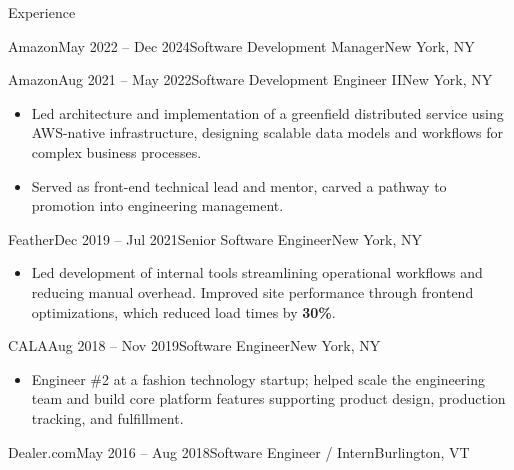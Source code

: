 \documentclass{resume} %
\begin{document}
\begin{rSection}{Experience}
\begin{rSubsection}{Amazon}{May 2022 -- Dec 2024}{Software Development Manager}{New York, NY}
\end{rSubsection}
\begin{rSubsection}{Amazon}{Aug 2021 -- May 2022}{Software Development Engineer II}{New York, NY}

\begin{itemize}
  \item Led architecture and implementation of a greenfield distributed service using AWS-native infrastructure, designing scalable data models and workflows for complex business processes.
  \item Served as front-end technical lead and mentor, carved a pathway to promotion into engineering management.
\end{itemize}

\end{rSubsection}


\begin{rSubsection}{Feather}{Dec 2019 -- Jul 2021}{Senior Software Engineer}{New York, NY}

\begin{itemize}
  \item Led development of internal tools streamlining operational workflows and reducing manual overhead. Improved site performance through frontend optimizations, which reduced load times by \textbf{30\%}.
\end{itemize}

\end{rSubsection}


\begin{rSubsection}{CALA}{Aug 2018 -- Nov 2019}{Software Engineer}{New York, NY}

\begin{itemize}
  \item Engineer \#2 at a fashion technology startup; helped scale the engineering team and build core platform features supporting product design, production tracking, and fulfillment.
\end{itemize}

\end{rSubsection}


\begin{rSubsection}{Dealer.com}{May 2016 -- Aug 2018}{Software Engineer / Intern}{Burlington, VT}


\end{rSubsection}
\end{rSection}
\end{document}

